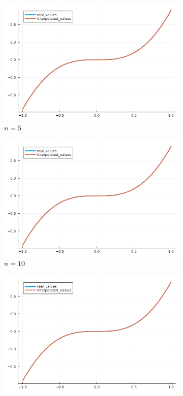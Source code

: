 \documentclass{article}
\def\v{0.47}
\begin{document}
	\begin{figure}[H]
	    \centering
		\begin{subfigure}[b]{\v\linewidth}
			\includegraphics[width=\linewidth]{graphs/zad5.b.5.png}
			\caption{$n = 5$}
		\end{subfigure}
		\begin{subfigure}[b]{\v\linewidth}
			\includegraphics[width=\linewidth]{graphs/zad5.b.10.png}
			\caption{$n = 10$}
		\end{subfigure}
		\begin{subfigure}[b]{\v\linewidth}
			\includegraphics[width=\linewidth]{graphs/zad5.b.15.png}

\end{subfigure}
\end{figure}
\end{document}

